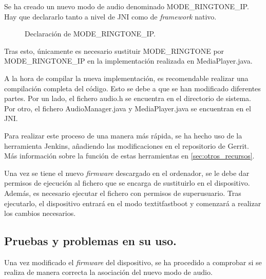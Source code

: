 Se ha creado un nuevo modo de audio denominado MODE\_RINGTONE\_IP. Hay que declararlo tanto a nivel de \gls{JNI} como de \textit{framework} nativo.

\begin{figure}[H]
	\centering
	\caption{Declaración de MODE\_RINGTONE\_IP.} \label{fig:mode_ringtone_ip}
\end{figure}

Tras esto, únicamente es necesario sustituir MODE\_RINGTONE por MODE\_RINGTONE\_IP en la implementación realizada en MediaPlayer.java.

A la hora de compilar la nueva implementación, es recomendable realizar una compilación completa del código. Esto se debe a que se han modificado diferentes partes. Por un lado, el fichero audio.h se encuentra en el directorio de sistema. Por otro, el fichero AudioManager.java y MediaPlayer.java se encuentran en el \gls{JNI}.

Para realizar este proceso de una manera más rápida, se ha hecho uso de la herramienta Jenkins, añadiendo las modificaciones en el repositorio de Gerrit. Más información sobre la función de estas herramientas en \ref{sec:otros_recursos}.

Una vez se tiene el nuevo \textit{firmware} descargado en el ordenador, se le debe dar permisos de ejecución al fichero que se encarga de sustituirlo en el dispositivo. Además, es necesario ejecutar el fichero con permisos de superusuario. Tras ejecutarlo, el dispositivo entrará en el modo textit{fastboot} y comenzará a realizar los cambios necesarios.
 
\subsection{Pruebas y problemas en su uso.}
Una vez modificado el \textit{firmware} del dispositivo, se ha procedido a comprobar si se realiza de manera correcta la asociación del nuevo modo de audio.

